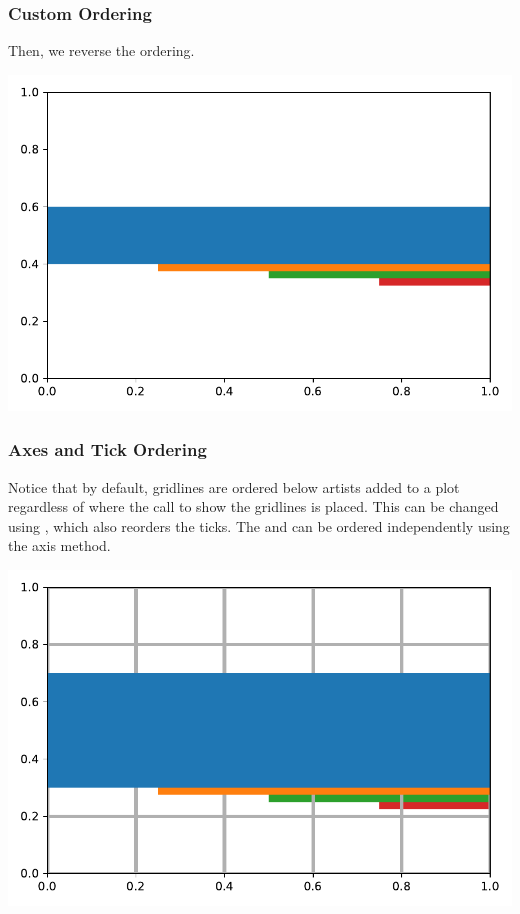 \subsubsection{Custom Ordering}

Then, we reverse the ordering.


\begin{center}
    \includegraphics[width = .8\textwidth]{figures/proseplots/reverse-z.pdf}
\end{center}


\subsubsection{Axes and Tick Ordering}

Notice that by default, gridlines are ordered below artists added to a plot regardless of where the call to show the gridlines is placed. This can be changed using , which also reorders the ticks. The  and  can be ordered independently using the  axis method.


\begin{center}
    \includegraphics[width = .8\textwidth]{figures/proseplots/default-axes.pdf}
\end{center}

